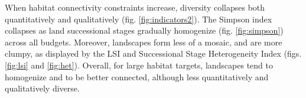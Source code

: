 When habitat connectivity constraints increase, diversity collapses both quantitatively and qualitatively (fig. \ref{fig:indicators2}). The Simpson index collapses as land successional stages gradually homogenize (fig.  \ref{fig:simpson}) across all budgets. Moreover, landscapes form less of a mosaic, and are more clumpy, as displayed by the LSI and Successional Stage Heterogeneity Index (figs. \ref{fig:lsi} and \ref{fig:het}). Overall, for large habitat targets, landscapes tend to homogenize and to be better connected, although less quantitatively and qualitatively diverse. 


